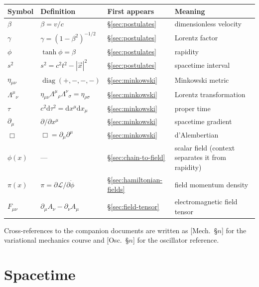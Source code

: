 \documentclass[11pt]{article}
\theoremstyle{plain}
\theoremstyle{definition}
\theoremstyle{remark}
\newcommand{\dd}{\mathrm{d}}
\newcommand{\vx}{\vec{x}}
\begin{document}
\begin{center}
\begin{tabular}{llll}
\toprule
Symbol & Definition & First appears & Meaning \\
\midrule
$\beta$ & $\beta = v/c$ & \S\ref{sec:postulates} & dimensionless velocity \\
$\gamma$ & $\gamma = (1-\beta^2)^{-1/2}$ & \S\ref{sec:postulates} & Lorentz factor \\
$\phi$ & $\tanh\phi = \beta$ & \S\ref{sec:postulates} & rapidity \\
$s^2$ & $s^2 = c^2 t^2 - |\vx|^2$ & \S\ref{sec:postulates} & spacetime interval \\
$\eta_{\mu\nu}$ & $\operatorname{diag}(+,-,-,-)$ & \S\ref{sec:minkowski} & Minkowski metric \\
$\Lambda^\mu{}_\nu$ & $\eta_{\mu\nu}\Lambda^\mu{}_\rho\Lambda^\nu{}_\sigma = \eta_{\rho\sigma}$ & \S\ref{sec:minkowski} & Lorentz transformation \\
$\tau$ & $c^2\dd\tau^2 = \dd x^\mu \dd x_\mu$ & \S\ref{sec:minkowski} & proper time \\
$\partial_\mu$ & $\partial/\partial x^\mu$ & \S\ref{sec:minkowski} & spacetime gradient \\
$\Box$ & $\Box = \partial_\mu\partial^\mu$ & \S\ref{sec:minkowski} & d'Alembertian \\
$\phi(x)$ & --- & \S\ref{sec:chain-to-field} & scalar field (context separates it from rapidity) \\
$\pi(x)$ & $\pi = \partial\mathcal L/\partial\dot\phi$ & \S\ref{sec:hamiltonian-fields} & field momentum density \\
$F_{\mu\nu}$ & $\partial_\mu A_\nu - \partial_\nu A_\mu$ & \S\ref{sec:field-tensor} & electromagnetic field tensor \\
\bottomrule
\end{tabular}
\end{center}

\vspace{1ex}
\noindent
Cross-references to the companion documents are written as
[Mech.\ \S$n$] for the variational mechanics course and [Osc.\ \S$n$] for
the oscillator reference.

\clearpage
\part{Spacetime}
\end{document}
